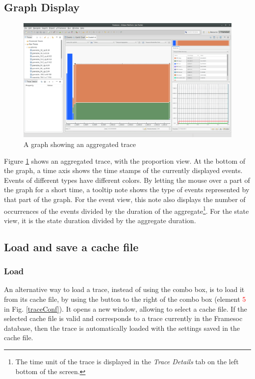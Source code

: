 \documentclass[twoside]{article}
\begin{document}
\begin{sloppypar}
\subsection{Graph Display}
\begin{figure}[h!]
	\centering
	\includegraphics[width=1.0\textwidth]{images/ocelotl_aggregated.png}
	\caption{A graph showing an aggregated trace}
	\label{showAggreg}
\end{figure}

Figure \ref{showAggreg} shows an aggregated trace, with the proportion view. At the bottom of the graph, a time axis shows the time stamps of the currently displayed events. Events of different types have different colors. By letting the mouse over a part of the graph for a short time, a tooltip note shows the type of events represented by that part of the graph. For the event view, this note also displays the number of occurrences of the events divided by the duration of the aggregate\footnote{The time unit of the trace is displayed in the \textit{Trace Details} tab on the left bottom of the screen.}. For the state view, it is the state duration divided by the aggregate duration.

\subsection{Load and save a cache file}
\subsubsection{Load}
An alternative way to load a trace, instead of using the combo box, is to load it from its cache file, by using the button to the right of the combo box (element \textcolor{red}{5} in Fig. \ref{traceConf}). It opens a new window, allowing to select a cache file. If the selected cache file is valid and corresponds to a trace currently in the Framesoc database, then the trace is automatically loaded with the settings saved in the cache file.


\end{sloppypar}
\end{document}
